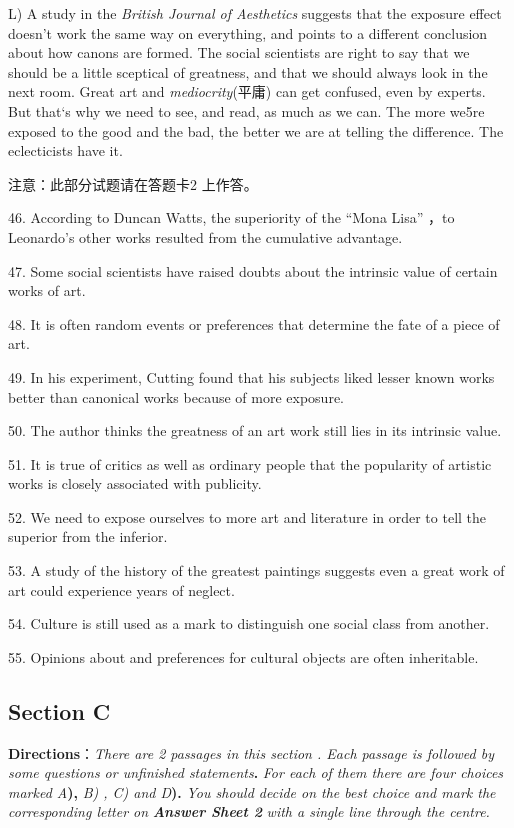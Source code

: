\documentclass[UTF8,11pt]{ctexart}
\begin{document}
L) A study in the\textit{ British Journal of Aesthetics} suggests that the exposure effect doesn’t work the same way on everything, and points to a different conclusion about how canons are formed. The social scientists are right to say that we should be a little sceptical of greatness, and that we should always look in the next room. Great art and\textit{ mediocrity}(平庸) can get confused, even by experts. But that‘s why we need to see, and read, as much as we can. The more we5re exposed to the good and the bad, the better we are at telling the difference. The eclecticists have it.


注意：此部分试题请在答题卡2 上作答。


46. According to Duncan Watts, the superiority of the “Mona Lisa” ，to Leonardo’s other works resulted from the cumulative advantage.


47. Some social scientists have raised doubts about the intrinsic value of certain works of art.


48. It is often random events or preferences that determine the fate of a piece of art.


49. In his experiment, Cutting found that his subjects liked lesser known works better than canonical works because of more exposure.


50. The author thinks the greatness of an art work still lies in its intrinsic value.


51. It is true of critics as well as ordinary people that the popularity of artistic works is closely associated with publicity.


52. We need to expose ourselves to more art and literature in order to tell the superior from the inferior.


53. A study of the history of the greatest paintings suggests even a great work of art could experience years of neglect.


54. Culture is still used as a mark to distinguish one social class from another.


55. Opinions about and preferences for cultural objects are often inheritable.


\subsection*{\textbf{Section C}}


\textbf{Directions}：\textit{There are 2 passages in this section . Each passage is followed by some questions or unfinished statements}\textbf{.} \textit{For each of them there are four choices marked A}\textbf{),}\textit{ B) , C) and D}\textbf{).}\textit{ You should decide on the best choice and mark the} \textit{corresponding letter on}\textbf{\textit{ Answer Sheet 2}}\textit{ with a single line through the centre.}
\end{document}
